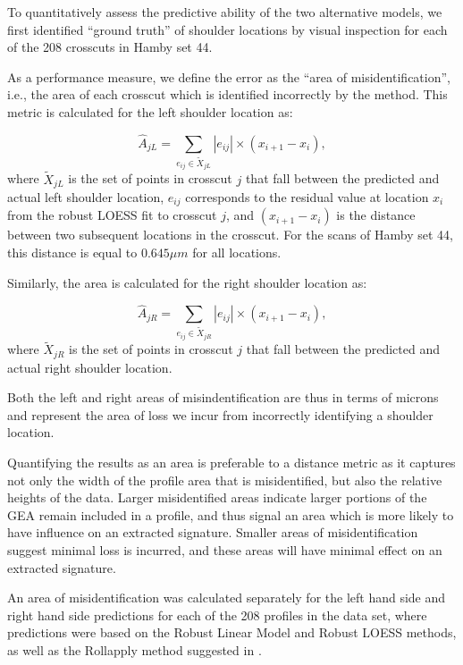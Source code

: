 \documentclass[12pt]{article}
\begin{document}
To quantitatively assess the predictive ability of the two alternative
models, we first identified ``ground truth'' of shoulder locations by
visual inspection for each of the 208 crosscuts in Hamby set 44.

As a performance measure, we define the error as the ``area of
misidentification'', i.e., the area of each crosscut which is identified
incorrectly by the method. This metric is calculated for the left
shoulder location as:

\[ \widehat{A}_{jL} = \sum_{e_{ij} \in \widetilde{X}_{jL}} \left|e_{ij} \right| \times \left(x_{i+1} - x_i \right),\]
where \(\widetilde{X}_{jL}\) is the set of points in crosscut \(j\) that
fall between the predicted and actual left shoulder location, \(e_{ij}\)
corresponds to the residual value at location \(x_i\) from the robust
LOESS fit to crosscut \(j\), and \((x_{i+1} - x_i)\) is the distance
between two subsequent locations in the crosscut. For the scans of Hamby
set 44, this distance is equal to \(0.645 \mu m\) for all locations.

Similarly, the area is calculated for the right shoulder location as:

\[ \widehat{A}_{jR} = \sum_{e_{ij} \in \widetilde{X}_{jR}} \left|e_{ij} \right| \times \left(x_{i+1} - x_i \right),\]
where \(\widetilde{X}_{jR}\) is the set of points in crosscut \(j\) that
fall between the predicted and actual right shoulder location.

Both the left and right areas of misindentification are thus in terms of
microns and represent the area of loss we incur from incorrectly
identifying a shoulder location.

Quantifying the results as an area is preferable to a distance metric as
it captures not only the width of the profile area that is
misidentified, but also the relative heights of the data. Larger
misidentified areas indicate larger portions of the GEA remain included
in a profile, and thus signal an area which is more likely to have
influence on an extracted signature. Smaller areas of misidentification
suggest minimal loss is incurred, and these areas will have minimal
effect on an extracted signature.

An area of misidentification was calculated separately for the left hand
side and right hand side predictions for each of the 208 profiles in the
data set, where predictions were based on the Robust Linear Model and
Robust LOESS methods, as well as the Rollapply method suggested in
\citet{Hare1}.
\end{document}
